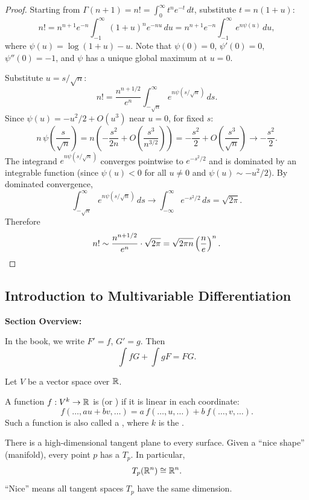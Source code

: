 \documentclass[../master/master.tex]{subfiles}
\begin{document}
\begin{proof}
Starting from $\Gamma(n+1) = n! = \int_0^\infty t^n e^{-t}\,dt$, substitute $t = n(1+u)$:
\[
n! = n^{n+1}e^{-n}\int_{-1}^{\infty}(1+u)^n e^{-nu}\,du = n^{n+1}e^{-n}\int_{-1}^{\infty} e^{n\psi(u)}\,du,
\]
where $\psi(u) = \log(1+u) - u$. Note that $\psi(0) = 0$, $\psi'(0) = 0$, $\psi''(0) = -1$, and $\psi$ has a unique global maximum at $u = 0$.

Substitute $u = s/\sqrt{n}$:
\[
n! = \frac{n^{n+1/2}}{e^n}\int_{-\sqrt{n}}^{\infty} e^{n\psi(s/\sqrt{n})}\,ds.
\]
Since $\psi(u) = -u^2/2 + O(u^3)$ near $u = 0$, for fixed $s$:
\[
n\,\psi\!\left(\frac{s}{\sqrt{n}}\right) = n\left(-\frac{s^2}{2n} + O\!\left(\frac{s^3}{n^{3/2}}\right)\right) = -\frac{s^2}{2} + O\!\left(\frac{s^3}{\sqrt{n}}\right) \to -\frac{s^2}{2}.
\]
The integrand $e^{n\psi(s/\sqrt{n})}$ converges pointwise to $e^{-s^2/2}$ and is dominated by an integrable function (since $\psi(u) < 0$ for all $u \neq 0$ and $\psi(u) \sim -u^2/2$). By dominated convergence,
\[
\int_{-\sqrt{n}}^{\infty} e^{n\psi(s/\sqrt{n})}\,ds \to \int_{-\infty}^{\infty} e^{-s^2/2}\,ds = \sqrt{2\pi}.
\]
Therefore
\[
n! \sim \frac{n^{n+1/2}}{e^n} \cdot \sqrt{2\pi} = \sqrt{2\pi n}\left(\frac{n}{e}\right)^n. \qedhere
\]
\end{proof}

\subsection{Introduction to Multivariable Differentiation}

\begin{summarybox}
\textbf{Section Overview:}
\end{summarybox}

In the book, we write $F' = f$, $G' = g$. Then
\[
\int fG + \int gF = FG.
\]

Let $V$ be a vector space over $\mathbb{R}$.

\begin{definition}
A function $f: V^k \to \mathbb{R}$ is  (or ) if it is linear in each coordinate:
\[
f(\dots, au + bv, \dots) = a\,f(\dots, u, \dots) + b\,f(\dots, v, \dots).
\]
Such a function is also called a , where $k$ is the .
\end{definition}

There is a high-dimensional tangent plane to every surface. Given a ``nice shape'' (manifold), every point $p$ has a  $T_p$. In particular,
\[
T_p(\mathbb{R}^n) \cong \mathbb{R}^n.
\]
``Nice'' means all tangent spaces $T_p$ have the same dimension.
\end{document}
